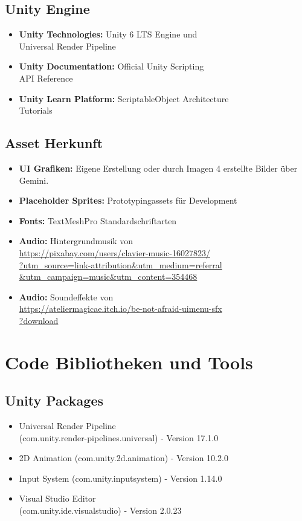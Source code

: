 \subsection{Unity Engine}
\begin{itemize}
    \item \textbf{Unity Technologies:} Unity 6 LTS Engine und \\
          Universal Render Pipeline
    \item \textbf{Unity Documentation:} Official Unity Scripting \\
          API Reference
    \item \textbf{Unity Learn Platform:} ScriptableObject Architecture \\
          Tutorials
\end{itemize}

\subsection{Asset Herkunft}
\begin{itemize}
    \item \textbf{UI Grafiken:} Eigene Erstellung oder durch Imagen 4 erstellte Bilder über Gemini.
    \item \textbf{Placeholder Sprites:} Prototypingassets für Development
    \item \textbf{Fonts:} TextMeshPro Standardschriftarten
    \item \textbf{Audio:} Hintergrundmusik von \\
          \url{https://pixabay.com/users/clavier-music-16027823/}\\
          \url{?utm_source=link-attribution&utm_medium=referral}\\
          \url{&utm_campaign=music&utm_content=354468}
    \item \textbf{Audio:} Soundeffekte von \\
          \url{https://ateliermagicae.itch.io/be-not-afraid-uimenu-sfx}\\
          \url{?download}
\end{itemize}

\section{Code Bibliotheken und Tools}

\subsection{Unity Packages}
\begin{itemize}
    \item Universal Render Pipeline \\
          (com.unity.render-pipelines.universal) - Version 17.1.0
    \item 2D Animation (com.unity.2d.animation) - Version 10.2.0  
    \item Input System (com.unity.inputsystem) - Version 1.14.0
    \item Visual Studio Editor \\
          (com.unity.ide.visualstudio) - Version 2.0.23
\end{itemize}

